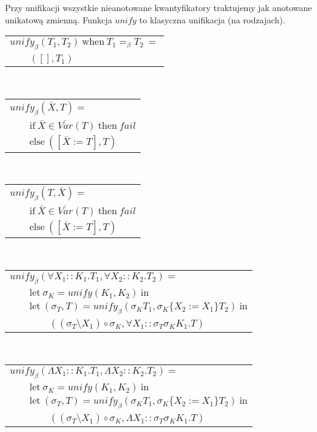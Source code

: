 \documentclass[11pt,leqno]{article}
\begin{document}
Przy unifikacji wszystkie nieanotowane kwantyfikatory traktujemy jak anotowane unikatową zmienną.
Funkcja $unify$ to klasyczna unifikacja (na rodzajach).\\
\begin{tabular}{l}
$unify_\beta(T_1, T_2) \ \textrm{when} \ T_1 =_\beta T_2 \ = $ \\
$\qquad ([], T_1)$ \\
\end{tabular} \\
\begin{tabular}{l}
$unify_\beta(\bar{X}, T) = $ \\
$\qquad \textrm{if} \ \bar{X} \in \bar{Var}(T) \ \textrm{then} \ fail $ \\
$\qquad \textrm{else} \ ([\bar{X} := T], T) $ \\
\end{tabular} \\
\begin{tabular}{l}
$unify_\beta(T, \bar{X}) = $ \\
$\qquad \textrm{if} \ \bar{X} \in \bar{Var}(T) \ \textrm{then} \ fail $ \\
$\qquad \textrm{else} \ ([\bar{X} := T], T) $ \\
\end{tabular} \\
\begin{tabular}{l}
$unify_\beta(\forall X_1::K_1.T_1, \forall X_2::K_2.T_2) = $ \\
$\qquad \textrm{let} \ \sigma_K = unify(K_1, K_2) \ \textrm{in} $ \\
$\qquad \textrm{let} \ (\sigma_T, T) = unify_\beta(\sigma_K T_1, \sigma_K \{X_2 := X_1\}T_2) \ \textrm{in} $ \\
$\qquad\qquad ((\sigma_T \setminus X_1) \circ \sigma_K, \forall X_1::\sigma_T \sigma_K K_1.T) $ \\
\end{tabular} \\
\begin{tabular}{l}
$unify_\beta(\Lambda X_1::K_1.T_1, \Lambda X_2::K_2.T_2) = $ \\
$\qquad \textrm{let} \ \sigma_K = unify(K_1, K_2) \ \textrm{in} $ \\
$\qquad \textrm{let} \ (\sigma_T, T) = unify_\beta(\sigma_K T_1, \sigma_K \{X_2 := X_1\}T_2) \ \textrm{in} $ \\
$\qquad\qquad ((\sigma_T \setminus X_1) \circ \sigma_K, \Lambda X_1::\sigma_T \sigma_K K_1.T) $ \\
\end{tabular} \\
\end{document}
